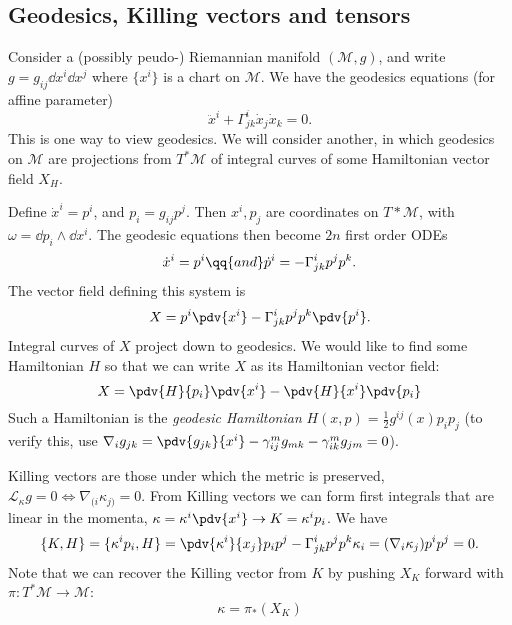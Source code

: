 \documentclass{jknotes}
\begin{document}
\subsection{Geodesics, Killing vectors and tensors}
Consider a (possibly peudo-) Riemannian manifold \((\mathcal{M},g)\), and write \(g=g_{ij}\dd{x^i}\dd{x^j}\) where \(\{x^i\}\) is a chart on \(\mathcal{M}\). We have the geodesics equations (for affine parameter)
\begin{equation}
    \ddot{x}^i + \Gamma^i_{jk} \dot{x}_j\dot{x}_k = 0.
\end{equation}
This is one way to view geodesics. We will consider another, in which geodesics on \(\mathcal{M}\) are projections from \(T^*\mathcal{M}\) of integral curves of some Hamiltonian vector field \(X_H\). 

Define \(\dot{x}^i=p^i\), and \(p_i=g_{ij}p^j\). Then \(x^i,p_j\) are coordinates on \(T*\mathcal{M}\), with \(\omega=\dd{p_i}\wedge\dd{x^i}\). The geodesic equations then become \(2n\) first order ODEs
\begin{equation}
    \dot{x}^i=p^i \qq{and} \dot{p}^i = -\Gamma^i_{jk}p^jp^k.
\end{equation}
The vector field defining this system is
\begin{equation}
    X = p^i\pdv{x^i} - \Gamma^i_{jk}p^jp^k\pdv{p^i}.
\end{equation}
Integral curves of \(X\) project down to geodesics. We would like to find some Hamiltonian \(H\) so that we can write \(X\) as its Hamiltonian vector field:
\begin{equation}
    X = \pdv{H}{p_i}\pdv{x^i} - \pdv{H}{x^i}\pdv{p_i}
\end{equation}
Such a Hamiltonian is the \emph{geodesic Hamiltonian} \(H(x,p) = \frac{1}{2}g^{ij}(x)p_ip_j\) (to verify this, use \(\nabla_ig_{jk} = \pdv{g_{jk}}{x^i} - \gamma^m_{ij}g_{mk} - \gamma^m_{ik}g_{jm} = 0\)).

Killing vectors are those under which the metric is preserved, \(\mathcal{L}_\kappa g=0 \iff \nabla_{(i}\kappa_{j)}=0\). From Killing vectors we can form first integrals that are linear in the momenta, \(\kappa = \kappa^i\pdv{x^i} \to K = \kappa^ip_i\). We have
\begin{equation}
    \{K,H\}=\{\kappa^ip_i,H\}=\pdv{\kappa^i}{x_j}p_ip^j - \Gamma^i_{jk}p^jp^k\kappa_i = (\nabla_i\kappa_j)p^ip^j = 0.
\end{equation}
Note that we can recover the Killing vector from \(K\) by pushing \(X_K\) forward with \(\pi:T^*\mathcal{M}\to\mathcal{M}\):
\begin{equation}
    \kappa = \pi_*(X_K)
\end{equation}
\end{document}
